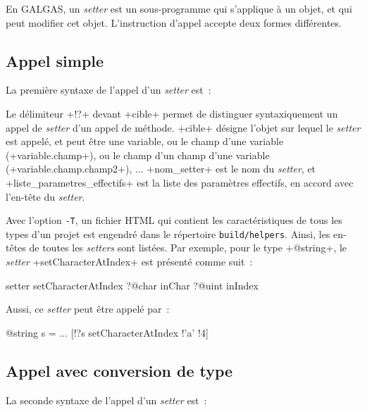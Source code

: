 

En GALGAS, un \emph{setter} est un sous-programme qui s'applique à un objet, et qui peut modifier cet objet. L'instruction d'appel accepte deux formes différentes.

\subsection{Appel simple}

La première syntaxe de l'appel d'un  \emph{setter} est~:
\begin{galgas}
\end{galgas}

Le délimiteur \ggs+!?+  devant \ggs+cible+ permet de distinguer syntaxiquement un appel de \emph{setter} d'un appel de méthode. \ggs+cible+ désigne l'objet sur lequel le \emph{setter} est appelé, et peut être une variable, ou le champ d'une variable (\ggs+variable.champ+), ou le champ d'un champ d'une variable (\ggs+variable.champ.champ2+), ... \ggs+nom_setter+ est le nom du \emph{setter}, et \ggs+liste_parametres_effectifs+ est la liste des paramètres effectifs, en accord avec l'en-tête du \emph{setter}.

Avec l'option \texttt{-T}, un fichier HTML qui contient les caractéristiques de tous les types d'un projet est engendré dans le répertoire \texttt{build/helpers}. Ainsi, les en-têtes de toutes les \emph{setters} sont listées. Par exemple, pour le type \ggs+@string+, le \emph{setter} \ggs+setCharacterAtIndex+ est présenté comme suit~:

\begin{galgas}
setter setCharacterAtIndex
  ?@char inChar
  ?@uint inIndex
\end{galgas}

Aussi, ce \emph{setter} peut être appelé par~:
\begin{galgas}
@string s = ...
[!?s setCharacterAtIndex !'a' !4]
\end{galgas}


\subsection{Appel avec conversion de type}

La seconde syntaxe de l'appel d'un  \emph{setter} est~:

\begin{galgas}
\end{galgas}

